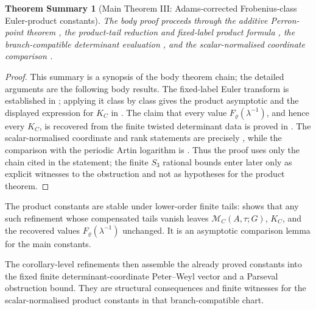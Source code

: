\documentclass[11pt,a4paper]{amsart}
\theoremstyle{plain}
\newtheorem*{theoremsummary}{Theorem Summary}
\theoremstyle{definition}
\theoremstyle{remark}
\begin{document}
\begin{theoremsummary}[Main Theorem III: Adams-corrected Frobenius-class Euler-product constants]
  The body proof proceeds through the additive Perron-point theorem
  ,
  the product-tail reduction and fixed-label product formula
  ,
  the branch-compatible determinant evaluation
  ,
  and the scalar-normalised coordinate comparison
  .
\end{theoremsummary}
\begin{proof}
  This summary is a synopsis of the body theorem chain; the detailed
  arguments are the following body results.  The fixed-label Euler
  transform is established in
  ; applying it class by class gives the
  product asymptotic and the displayed expression for \(K_C\) in
  .  The claim that every value
  \(F_\varrho(\lambda^{-1})\), and hence every \(K_C\), is recovered from the
  finite twisted determinant data is proved in
  .
  The scalar-normalised coordinate and rank statements are precisely
  , while the comparison
  with the periodic Artin logarithm is
  .
  Thus the proof uses only the chain cited in the statement; the finite
  \(S_3\) rational bounds enter later only as explicit witnesses to the
  obstruction and not as hypotheses for the product theorem.
\end{proof}

The product constants are stable under lower-order finite tails:
 shows that any such
refinement whose compensated tails vanish leaves \(\mathcal M_C(A,\tau;G)\),
\(K_C\), and the recovered values \(F_\varrho(\lambda^{-1})\) unchanged.
It is an asymptotic comparison lemma for the main constants.

The corollary-level refinements
then assemble the already proved constants into the fixed finite
determinant-coordinate Peter--Weyl vector and a Parseval obstruction bound.
They are structural consequences and finite witnesses for the scalar-normalised
product constants in that branch-compatible chart.
\end{document}
